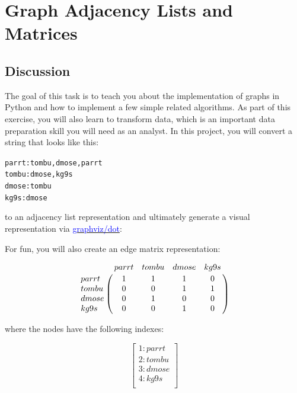 \chapter{Graph Adjacency Lists and Matrices}

\setcounter{problem}{1}
\section{Discussion}

\begin{fullwidth}

The goal of this task is to teach you about the implementation of graphs in Python and how to implement a few simple related algorithms.  As part of this exercise, you will also learn to transform data, which is an important data preparation skill you will need as an analyst.   In this project, you will convert a string that looks like this:

\begin{alltt}\small
parrt: tombu, dmose, parrt
tombu: dmose, kg9s
dmose: tombu
kg9s: dmose
\end{alltt}

\noindent to an adjacency list representation and ultimately generate a visual representation via \href{http://www.graphviz.org/}{\textcolor{blue}{graphviz/dot}}:

\begin{center}
\end{center}

\noindent For fun, you will also create an edge matrix representation:

\[
\bordermatrix{
~ & parrt & tombu & dmose & kg9s \cr
parrt & 1 & 1 & 1 & 0\cr
tombu & 0 & 0 & 1 & 1 \cr
dmose & 0 & 1 & 0 & 0 \cr
kg9s & 0 & 0 & 1 & 0\cr
}
\]

\noindent where the nodes have the following indexes:
 
\[
\left[
\begin{array}{c}
1: parrt \\
2: tombu \\
3: dmose \\
4: kg9s \\
\end{array}
\right]
\]


\end{fullwidth}
